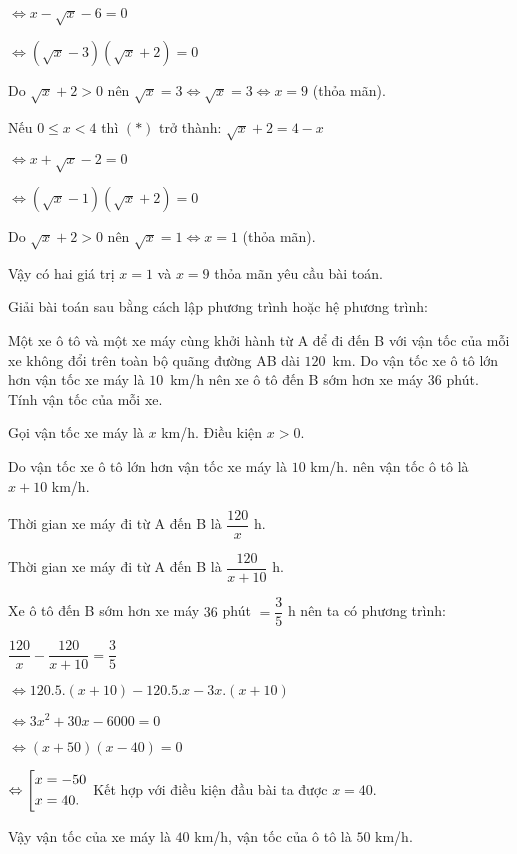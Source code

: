 \begin{ex}
{\begin{enumerate}
         $\Leftrightarrow x-\sqrt{x}-6=0$
         
         $\Leftrightarrow (\sqrt{x}-3)(\sqrt{x}+2)=0$
         
         Do $\sqrt{x}+2>0$ nên $\sqrt{x}=3 \Leftrightarrow \sqrt{x}=3 \Leftrightarrow x=9$ (thỏa mãn).
     
Nếu $0\le x < 4$ thì $(*)$ trở thành: $\sqrt{x}+2=4-x$

$\Leftrightarrow x + \sqrt{x}-2=0$

$\Leftrightarrow (\sqrt{x}-1)(\sqrt{x}+2)=0$

Do $\sqrt{x}+2>0$ nên $\sqrt{x}=1 \Leftrightarrow x=1$ (thỏa mãn). 

Vậy có hai giá trị $x=1$ và $x=9$ thỏa mãn yêu cầu bài toán.
    \end{enumerate}
    }
\end{ex}

\begin{ex}%
	
	Giải bài toán sau bằng cách lập phương trình hoặc hệ phương trình:
	
	Một xe ô tô và một xe máy cùng khởi hành từ A để đi đến B với vận tốc của mỗi xe không đổi trên toàn bộ quãng đường AB dài $120$~km. Do vận tốc xe ô tô lớn hơn vận tốc xe
	máy là $10$~km/h nên xe ô tô đến B sớm hơn xe máy $36$ phút. Tính vận tốc của mỗi xe.
    \hfill
    
\loigiai
    {Gọi vận tốc xe máy là $x$ km/h. Điều kiện $x>0$.
    	
    Do vận tốc xe ô tô lớn hơn vận tốc xe máy là $10$ km/h. nên vận tốc ô tô là $x+10$ km/h.
    
    Thời gian xe máy đi từ A đến B là $\dfrac{120}{x}$ h.
    
    Thời gian xe máy đi từ A đến B là $\dfrac{120}{x+10}$  h.
    
    Xe ô tô đến B sớm hơn xe máy $36$ phút $=\dfrac{3}{5}$ h nên ta có phương trình: 
    
    $\dfrac{120}{x}-\dfrac{120}{x+10}=\dfrac{3}{5}$
    
    $\Leftrightarrow 120.5.(x+10)-120.5.x-3x.(x+10)$
    
    $\Leftrightarrow 3x^2 +30x-6000=0$
    
$\Leftrightarrow (x+50)(x-40)=0$

$\Leftrightarrow \left[\begin{aligned}&x=-50\\
	&x=40.\end{aligned}\right.$   
Kết hợp với điều kiện đầu bài ta được $x=40$.

Vậy vận tốc của xe máy là $40$ km/h, vận tốc của ô tô là $50$ km/h.  
}
\end{ex}

